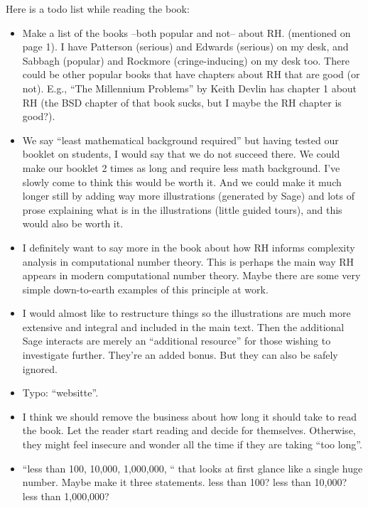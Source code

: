 \documentclass{article}
\begin{document}
Here is a todo list while reading the book:  
\begin{itemize}
\item Make a list of the books --both popular and not-- about
  RH. (mentioned on page 1).  I have Patterson (serious) and Edwards
  (serious) on my desk, and Sabbagh (popular) and Rockmore
  (cringe-inducing) on my desk too.  There could be other popular
  books that have chapters about RH that are good (or not).  E.g.,
  ``The Millennium Problems'' by Keith Devlin has chapter 1 about RH
  (the BSD chapter of that book sucks, but I maybe the RH chapter is
  good?).   
\item We say ``least mathematical background required'' but having
  tested our booklet on students, I would say that we do not succeed
  there.  We could make our booklet 2 times as long and require less
  math background.  I've slowly come to think this would be worth it.
  And we could make it much longer still by adding way more
  illustrations (generated by Sage) and lots of prose explaining what
  is in the illustrations (little guided tours), and this would also
  be worth it.

\item I definitely want to say more in the book about how RH informs
  complexity analysis in computational number theory.  This is perhaps
  the main way RH appears in modern computational number theory.
  Maybe there are some very simple down-to-earth examples of this
  principle at work.

\item I would almost like to restructure things so the illustrations
  are much more extensive and integral and included in the main text.
  Then the additional Sage interacts are merely an ``additional
  resource'' for those wishing to investigate further.  They're an
  added bonus.  But they can also be safely ignored. 

\item Typo: ``websitte''.

\item I think we should remove the business about how long it should
  take to read the book.  Let the reader start reading and decide for
  themselves.  Otherwise, they might feel insecure and wonder all the
  time if they are taking ``too long''. 

\item ``less than 100, 10,000, 1,000,000, `` that looks at first
  glance like a single huge number.  Maybe make it three statements.
less than 100?  less than 10,000?  less than 1,000,000?


\end{itemize}
\end{document}
